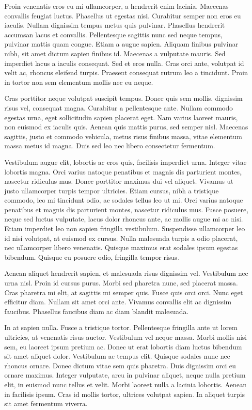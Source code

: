 Proin venenatis eros eu mi ullamcorper, a hendrerit enim lacinia. Maecenas convallis feugiat luctus. Phasellus ut egestas nisi. Curabitur semper non eros eu iaculis. Nullam dignissim tempus metus quis pulvinar. Phasellus hendrerit accumsan lacus et convallis. Pellentesque sagittis nunc sed neque tempus, pulvinar mattis quam congue. Etiam a augue sapien. Aliquam finibus pulvinar nibh, sit amet dictum sapien finibus id. Maecenas a vulputate mauris. Sed imperdiet lacus a iaculis consequat. Sed et eros nulla. Cras orci ante, volutpat id velit ac, rhoncus eleifend turpis. Praesent consequat rutrum leo a tincidunt. Proin in tortor non sem elementum mollis nec eu neque.

Cras porttitor neque volutpat suscipit tempus. Donec quis sem mollis, dignissim risus vel, consequat magna. Curabitur a pellentesque ante. Nullam commodo egestas urna, eget sollicitudin sapien placerat eget. Nam varius laoreet mauris, non euismod ex iaculis quis. Aenean quis mattis purus, sed semper nisl. Maecenas sagittis, justo et commodo vehicula, metus risus finibus massa, vitae elementum massa metus id magna. Duis sed leo nec libero consectetur fermentum.

Vestibulum augue elit, lobortis ac eros quis, facilisis imperdiet urna. Integer vitae lobortis magna. Orci varius natoque penatibus et magnis dis parturient montes, nascetur ridiculus mus. Donec porttitor maximus dui vel aliquet. Vivamus ut justo ullamcorper turpis tempor ultricies. Etiam cursus, nibh a tristique commodo, leo mi tincidunt odio, ac sodales tellus leo ut mi. Orci varius natoque penatibus et magnis dis parturient montes, nascetur ridiculus mus. Fusce posuere, neque sed luctus vulputate, lacus dolor rhoncus ante, ac mollis augue mi ac nisi. Etiam imperdiet leo non sapien fringilla vestibulum. Suspendisse ullamcorper leo id nisi volutpat, at euismod ex cursus. Nulla malesuada turpis a odio placerat, nec ullamcorper libero venenatis. Quisque maximus erat sodales ipsum egestas bibendum. Quisque eu posuere odio, fringilla tempor risus.

Aenean aliquet hendrerit sapien, et malesuada risus dignissim vel. Vestibulum nec urna nisl. Proin id cursus purus. Morbi sed pharetra nunc, sed placerat massa. Cras pharetra mi elit, at sagittis mi semper quis. Fusce quis orci orci. Nunc eget efficitur diam. Nullam sit amet orci ante. Vivamus convallis elit ac dignissim faucibus. Phasellus faucibus diam ac diam blandit malesuada.

In at sapien nulla. Fusce a tristique tortor. Pellentesque fringilla ante ut lorem ultricies, at venenatis risus auctor. Vestibulum vel neque massa. Morbi mollis nisi sem, eu laoreet ipsum pretium ac. Donec ut erat lobortis diam luctus bibendum sit amet aliquet dolor. Vestibulum ac tempus elit. Quisque sodales nunc nec rhoncus ornare. Donec dictum vitae sem quis pharetra. Duis dignissim orci eu ornare maximus. Integer vulputate, arcu in pulvinar aliquet, neque nulla pretium elit, in euismod nunc tellus et velit. Morbi laoreet nulla a lacinia lobortis. Aenean in facilisis ipsum. Cras id mollis tortor, ultrices volutpat sapien. In aliquet turpis sit amet fermentum viverra.

